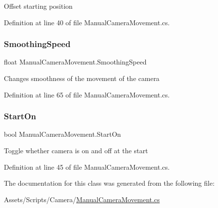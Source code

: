 Offset starting position 



Definition at line 40 of file Manual\+Camera\+Movement.\+cs.

\mbox{\label{class_manual_camera_movement_a368f05f76a1622fac5f6460c7f5da8d2}} 
\subsubsection{\texorpdfstring{Smoothing\+Speed}{SmoothingSpeed}}
{\footnotesize\ttfamily float Manual\+Camera\+Movement.\+Smoothing\+Speed}



Changes smoothness of the movement of the camera 



Definition at line 65 of file Manual\+Camera\+Movement.\+cs.

\mbox{\label{class_manual_camera_movement_aabdb8ce630c89c62182c5d657a205911}} 
\subsubsection{\texorpdfstring{Start\+On}{StartOn}}
{\footnotesize\ttfamily bool Manual\+Camera\+Movement.\+Start\+On}



Toggle whether camera is on and off at the start 



Definition at line 45 of file Manual\+Camera\+Movement.\+cs.



The documentation for this class was generated from the following file\+:\begin{DoxyCompactItemize}
\item 
Assets/\+Scripts/\+Camera/\mbox{\hyperlink{_manual_camera_movement_8cs}{Manual\+Camera\+Movement.\+cs}}\end{DoxyCompactItemize}
